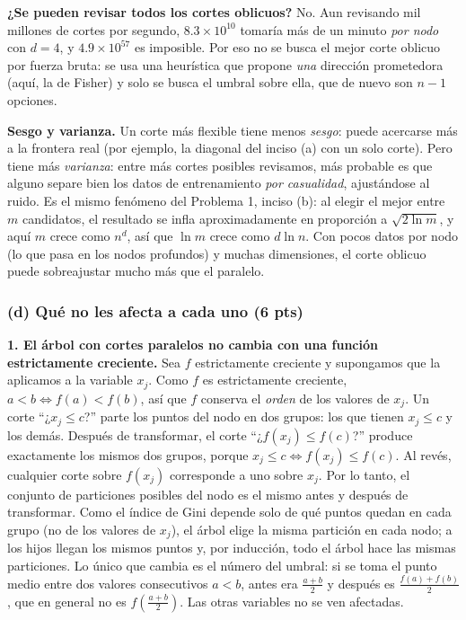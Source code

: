 \documentclass[11pt, letterpaper]{article}
\begin{document}
\textbf{¿Se pueden revisar todos los cortes oblicuos?} No. Aun revisando mil millones de cortes por segundo, $8.3 \times 10^{10}$ tomaría más de un minuto \emph{por nodo} con $d = 4$, y $4.9 \times 10^{57}$ es imposible. Por eso no se busca el mejor corte oblicuo por fuerza bruta: se usa una heurística que propone \emph{una} dirección prometedora (aquí, la de Fisher) y solo se busca el umbral sobre ella, que de nuevo son $n - 1$ opciones.

\textbf{Sesgo y varianza.} Un corte más flexible tiene menos \emph{sesgo}: puede acercarse más a la frontera real (por ejemplo, la diagonal del inciso (a) con un solo corte). Pero tiene más \emph{varianza}: entre más cortes posibles revisamos, más probable es que alguno separe bien los datos de entrenamiento \emph{por casualidad}, ajustándose al ruido. Es el mismo fenómeno del Problema 1, inciso (b): al elegir el mejor entre $m$ candidatos, el resultado se infla aproximadamente en proporción a $\sqrt{2\ln m}$, y aquí $m$ crece como $n^d$, así que $\ln m$ crece como $d \ln n$. Con pocos datos por nodo (lo que pasa en los nodos profundos) y muchas dimensiones, el corte oblicuo puede sobreajustar mucho más que el paralelo.

\subsubsection*{(d) Qué no les afecta a cada uno (6 pts)}

\textbf{1. El árbol con cortes paralelos no cambia con una función estrictamente creciente.} Sea $f$ estrictamente creciente y supongamos que la aplicamos a la variable $x_j$. Como $f$ es estrictamente creciente, $a < b \iff f(a) < f(b)$, así que $f$ conserva el \emph{orden} de los valores de $x_j$. Un corte ``¿$x_j \le c$?'' parte los puntos del nodo en dos grupos: los que tienen $x_j \le c$ y los demás. Después de transformar, el corte ``¿$f(x_j) \le f(c)$?'' produce exactamente los mismos dos grupos, porque $x_j \le c \iff f(x_j) \le f(c)$. Al revés, cualquier corte sobre $f(x_j)$ corresponde a uno sobre $x_j$. Por lo tanto, el conjunto de particiones posibles del nodo es el mismo antes y después de transformar. Como el índice de Gini depende solo de qué puntos quedan en cada grupo (no de los valores de $x_j$), el árbol elige la misma partición en cada nodo; a los hijos llegan los mismos puntos y, por inducción, todo el árbol hace las mismas particiones. Lo único que cambia es el número del umbral: si se toma el punto medio entre dos valores consecutivos $a < b$, antes era $\frac{a+b}{2}$ y después es $\frac{f(a)+f(b)}{2}$, que en general no es $f\!\left(\frac{a+b}{2}\right)$. Las otras variables no se ven afectadas.
\end{document}
